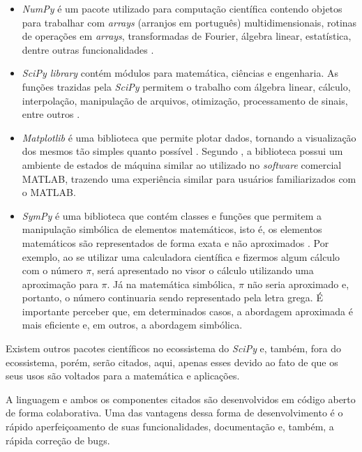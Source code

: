 \documentclass[
	12pt,				%
	openright,			%
    twoside,			%
	a4paper,			%
	english,			%
	french,				%
	spanish,			%
	brazil				%
	]{abntex2}
\numberwithin{lema}{chapter}
\numberwithin{teorema}{chapter}
\numberwithin{definicao}{chapter}
\numberwithin{exemplo}{chapter}
\numberwithin{figure}{chapter}
\begin{document}
\begin{itemize}
	\item \textit{NumPy} é um pacote utilizado para computação científica contendo objetos para trabalhar com \textit{arrays} (arranjos em português) multidimensionais, rotinas de operações em \textit{arrays}, transformadas de Fourier, álgebra linear, estatística, dentre outras funcionalidades \cite{NumPy}.
	
	\item \textit{SciPy library} contém módulos para matemática, ciências e engenharia. As funções trazidas pela \textit{SciPy} permitem o trabalho com álgebra linear, cálculo, interpolação, manipulação de arquivos, otimização, processamento de sinais, entre outros \cite{SciPy}.
	
	\item \textit{Matplotlib} é uma biblioteca que permite plotar dados, tornando a visualização dos mesmos tão simples quanto possível \cite{Matplotlib}. Segundo , a biblioteca possui um ambiente de estados de máquina similar ao utilizado no \textit{software} comercial MATLAB, trazendo uma experiência similar para usuários familiarizados com o MATLAB.
	
	\item \textit{SymPy} é uma biblioteca que contém classes e funções que permitem a manipulação simbólica de elementos matemáticos, isto é, os elementos matemáticos são representados de forma exata e não aproximados \cite{SymPy}. Por exemplo, ao se utilizar uma calculadora científica e fizermos algum cálculo com o número $\pi$, será apresentado no visor o cálculo utilizando uma aproximação para $\pi$. Já na matemática simbólica, $\pi$ não seria aproximado e, portanto, o número continuaria sendo representado pela letra grega. É importante perceber que, em determinados casos, a abordagem aproximada é mais eficiente e, em outros, a abordagem simbólica.
\end{itemize}

Existem outros pacotes científicos no ecossistema do \textit{SciPy} e, também, fora do ecossistema, porém, serão citados, aqui, apenas esses devido ao fato de que os seus usos são voltados para a matemática e aplicações.

A linguagem e ambos os componentes citados são desenvolvidos em código aberto de forma colaborativa. Uma das vantagens dessa forma de desenvolvimento é o rápido aperfeiçoamento de suas funcionalidades, documentação e, também, a rápida correção de bugs.
\end{document}
